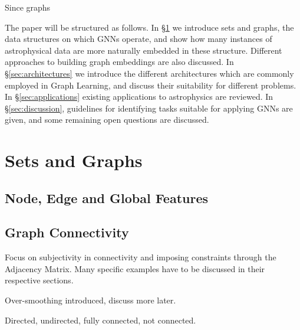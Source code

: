 \documentclass[twocolumn,floatfix]{aastex63}
\begin{document}

Since graphs 

The paper will be structured as follows. In \S \ref{sec:sets_graphs} we introduce sets and graphs, the data structures on which GNNs operate, and show how many instances of astrophysical data are more naturally embedded in these structure. Different approaches to building graph embeddings are also discussed. In \S \ref{sec:architectures} we introduce the different architectures which are commonly employed in Graph Learning, and discuss their suitability for different problems. In \S \ref{sec:applications} existing applications to astrophysics are reviewed. In \S \ref{sec:discussion}, guidelines for identifying tasks suitable for applying GNNs are given, and some remaining open questions are discussed.

\section{Sets and Graphs}
\label{sec:sets_graphs}


\subsection{Node, Edge and Global Features}

\subsection{Graph Connectivity}

Focus on subjectivity in connectivity and imposing constraints through the Adjacency Matrix. Many specific examples have to be discussed in their respective sections.

Over-smoothing introduced, discuss more later.

Directed, undirected, fully connected, not connected.

\end{document}
